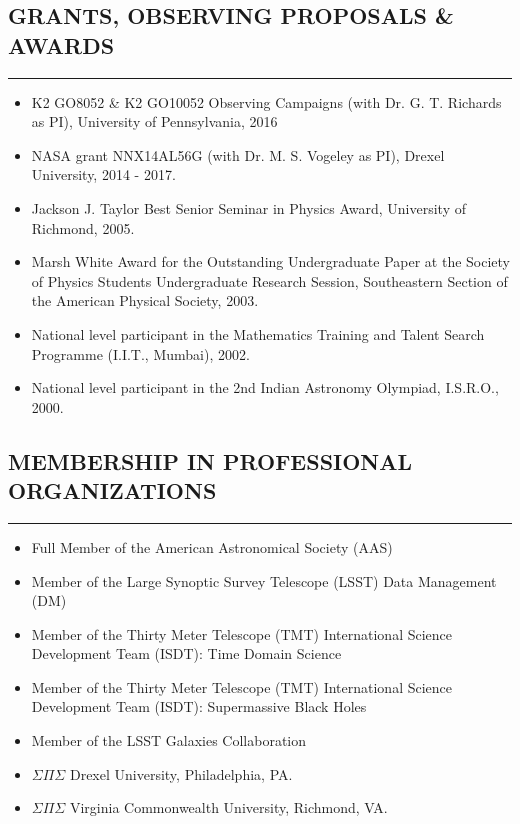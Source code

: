 \documentclass[10pt,a4]{article}
\newcounter{mySaveCounter}
\newcommand\myEnumReset{\setcounter{mySaveCounter}{0}}
\begin{document}
\subsection*{GRANTS, OBSERVING PROPOSALS \& AWARDS}
\hrule  height 4pt
\vspace{0.2cm}
\begin{itemize}
  \item K2 GO8052 \& K2 GO10052 Observing Campaigns (with Dr. G. T. Richards as PI), University of Pennsylvania, 2016
  \item NASA grant NNX14AL56G (with Dr. M. S. Vogeley as PI), Drexel University, 2014 - 2017.
	\item Jackson J. Taylor Best Senior Seminar in Physics Award, University of Richmond, 2005.
  \item Marsh White Award for the Outstanding Undergraduate Paper at the Society of Physics Students Undergraduate Research Session, Southeastern Section of the American Physical Society, 2003.
	\item National level participant in the Mathematics Training and Talent Search Programme (I.I.T., Mumbai), 2002.
	\item National level participant in the 2nd Indian Astronomy Olympiad, I.S.R.O., 2000.
\end{itemize}
\myEnumReset

\subsection*{MEMBERSHIP IN PROFESSIONAL ORGANIZATIONS}
\hrule  height 4pt
\vspace{0.2cm}
\begin{itemize}
	\item Full Member of the American Astronomical Society (AAS)
	\item Member of the Large Synoptic Survey Telescope (LSST) Data Management (DM)
	\item Member of the Thirty Meter Telescope (TMT) International Science Development Team (ISDT): Time Domain Science
	\item Member of the Thirty Meter Telescope (TMT) International Science Development Team (ISDT): Supermassive Black Holes
    \item Member of the LSST Galaxies Collaboration
	\item $\Sigma \Pi \Sigma$ Drexel University, Philadelphia, PA.
	\item $\Sigma \Pi \Sigma$ Virginia Commonwealth University, Richmond, VA.
\end{itemize}
\myEnumReset
\end{document}
